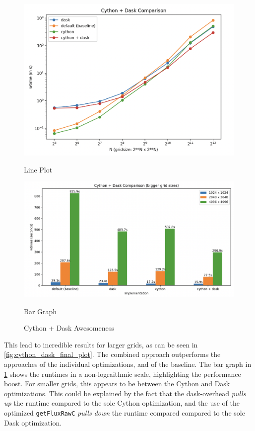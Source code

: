 \documentclass[a4paper,10pt]{article}
\begin{document}
\begin{figure}[h!]
   \begin{minipage}{0.5\textwidth}
       \centering
       \includegraphics[width=\linewidth]{images/cython_dask/cython_dask_final_plot.png}
      \caption{Line Plot}
       \label{fig:cython_dask_final_plot}
   \end{minipage}
   \hspace{0.1cm}
   \begin{minipage}{0.5\textwidth}
       \centering
       \includegraphics[width=\linewidth]{images/cython_dask/cython_dask_final_bar.png}
      \caption{Bar Graph}
      \label{fig:cython_dask_final_bar}
  \end{minipage}
  \caption{Cython + Dask Awesomeness}
\end{figure}

This lead to incredible results for larger grids, as can be seen in \ref{fig:cython_dask_final_plot}.
The combined approach outperforms the approaches of the individual optimizations, and of the baseline.
The bar graph in \ref{fig:cython_dask_final_bar} shows the runtimes in a non-lograithmic scale, highlighting the performance boost.
For smaller grids, this appears to be between the Cython and Dask optimizations.
This could be explained by the fact that the dask-overhead \textit{pulls up} the runtime compared to the sole Cython optimization, and the use of the optimized \verb|getFluxRawC| \textit{pulls down} the runtime compared compared to the sole Dask optimization.
\end{document}
